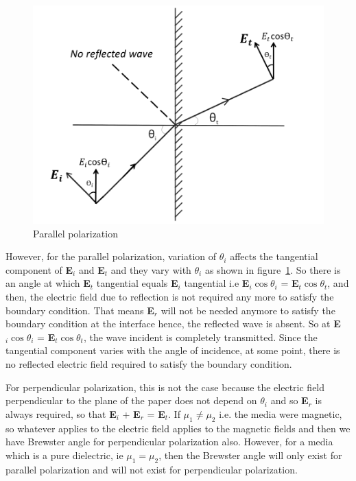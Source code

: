 \begin{figure}[h]
\centering
\includegraphics[width=1\linewidth]{./graphics/No_reflection}
\caption{Parallel polarization}
\label{fig:mcben2}
\end{figure}	

However, for the parallel polarization, variation of $\theta_i$ affects the tangential component of \textbf{E}$_i$ and \textbf{E}$_t$ and they vary with $\theta_i$ as shown in figure~\ref{fig:mcben2}. So there is an angle at which \textbf{E}$_t$ tangential equals \textbf{E}$_i$ tangential i.e \textbf{E}$_i\cos\theta_i$ = \textbf{E}$_t\cos\theta_t$, and then, the electric field due to reflection is not required any more to satisfy the boundary condition. That means \textbf{E}$_r$ will not be needed anymore to satisfy the boundary condition at the interface hence, the reflected wave is absent. So at \textbf{E}$_i\cos\theta_i$ = \textbf{E}$_t\cos\theta_t$, the wave incident is completely transmitted. Since the tangential component varies with the angle of incidence, at some point, there is no reflected electric field required to satisfy the boundary condition.

For perpendicular polarization, this is not the case because the electric field perpendicular to the plane of the paper does not depend on $\theta_i$ and so \textbf{E}$_r$ is always required, so that \textbf{E}$_i$ + \textbf{E}$_r$ = \textbf{E}$_t$. If $\mu_1 \neq \mu_2$ i.e. the media were magnetic, so whatever applies to the electric field applies to the magnetic fields and then we have Brewster angle for perpendicular polarization also. However, for a media which is a pure dielectric, ie $\mu_1 = \mu_2$, then the Brewster angle will only exist for parallel polarization and will not exist for perpendicular polarization.

